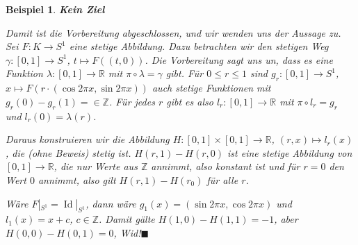 \documentclass[12pt]{scrbook}   %
\newtheorem{bspX}[alles]{Beispiel}
\newenvironment{bsp}[1]{\begin{bspX}{\bf #1}\par\rm}{\end{bspX}}
\newcommand{\qed}{\phantom{.}\hfill{$\blacksquare$}}
\begin{document}
\begin{bsp}{Kein Ziel}
Damit ist die Vorbereitung abgeschlossen, und wir wenden uns der Aussage zu. Sei $F:K\to S^1$ eine stetige Abbildung. Dazu betrachten wir den stetigen Weg $\gamma:[0,1]\to S^1$, $t\mapsto F( (t,0))$. Die Vorbereitung sagt uns un, dass es eine Funktion $\lambda:[0,1]\to \mathbb R$ mit $\pi\circ\lambda=\gamma$ gibt. Für $0\le r\le1$ sind $g_r:[0,1] \to S^1$, $x\mapsto F(r\cdot(\cos2\pi x, \sin2\pi x))$ auch stetige Funktionen mit $g_r(0)-g_r(1)=\in \mathbb Z$. Für jedes $r$ gibt es also $l_r:[0,1]\to\mathbb R$ mit $\pi\circ l_r=g_r$ und $l_r(0)=\lambda(r)$.

Daraus konstruieren wir die Abbildung $H:[0,1]\times[0,1]\to \mathbb R$, $(r,x)\mapsto l_r(x)$, die (ohne Beweis) stetig ist. $H(r,1)-H(r,0)$ ist eine stetige Abbildung von $[0,1]\to \mathbb R$, die nur Werte aus $\mathbb Z$ annimmt, also konstant ist und für $r=0$ den Wert $0$ annimmt, also gilt $H(r,1)-H(r_0)$ für alle $r$.

Wäre $F|_{S^1}=\operatorname{Id}|_{S^1}$, dann wäre $g_1(x)=(\sin2\pi x, \cos2\pi x)$ und $l_1(x)=x+c$, $c\in \mathbb Z$. Damit gälte $H(1,0)-H(1,1)=-1$, aber $H(0,0)-H(0,1)=0$, Wid!\qed
\end{bsp}
\end{document}
